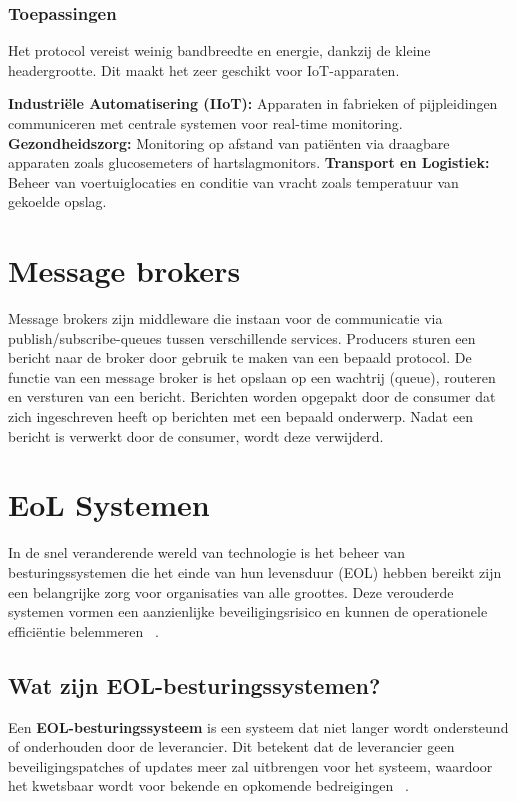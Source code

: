 \subsubsection{Toepassingen}
Het protocol vereist weinig bandbreedte en energie, dankzij de kleine headergrootte. 
Dit maakt het zeer geschikt voor IoT-apparaten.

\textbf{Industriële Automatisering (IIoT):} Apparaten in fabrieken of pijpleidingen communiceren met centrale systemen voor real-time monitoring.
\textbf{Gezondheidszorg:} Monitoring op afstand van patiënten via draagbare apparaten zoals glucosemeters of hartslagmonitors.
\textbf{Transport en Logistiek:} Beheer van voertuiglocaties en conditie van vracht zoals temperatuur van gekoelde opslag.
 
\section{Message brokers}
Message brokers zijn middleware die instaan voor de communicatie via publish/subscribe-queues tussen verschillende services.
Producers sturen een bericht naar de broker door gebruik te maken van een bepaald protocol.
De functie van een message broker is het opslaan op een wachtrij (queue), routeren en versturen van een bericht.
Berichten worden opgepakt door de consumer dat zich ingeschreven heeft op berichten met een bepaald onderwerp.
Nadat een bericht is verwerkt door de consumer, wordt deze verwijderd.

\section{EoL Systemen}
In de snel veranderende wereld van technologie is het beheer van besturingssystemen die het einde van hun levensduur (EOL) 
hebben bereikt zijn een belangrijke zorg voor organisaties van alle groottes. 
Deze verouderde systemen vormen een aanzienlijke beveiligingsrisico en kunnen de operationele efficiëntie belemmeren ~\autocite{Mittal2024}.

\subsection{Wat zijn EOL-besturingssystemen?}
Een \textbf{EOL-besturingssysteem} is een systeem dat niet langer wordt ondersteund of onderhouden door de leverancier. 
Dit betekent dat de leverancier geen beveiligingspatches of updates meer zal uitbrengen voor het systeem, 
waardoor het kwetsbaar wordt voor bekende en opkomende bedreigingen ~\autocite{Mittal2024}.

